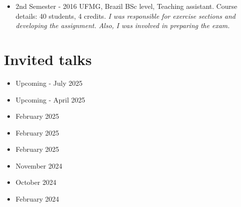 \documentclass[10pt,A4]{article} %
\begin{document}
\begin{itemize}
    \item {}
    {   2nd Semester - 2016  }
    { UFMG, Brazil }
    {  BSc level, Teaching assistant. Course details: 40 students, 4 credits.  \emph{ I was responsible for exercise sections and developing the assignment. Also, I was involved in preparing the exam. } }
    
\end{itemize}

\section{Invited talks}

{\small
\begin{itemize}

    
        \item {}
    { }
    {  Upcoming - July 2025}
    { }{}
    
      
    
        \item {}
    { }
    {  Upcoming - April 2025}
    { }{}
    
      
    
        \item {}
    { }
    {  February 2025}
    { }{}
    
      
    
        \item {}
    { }
    {  February 2025}
    { }{}
    
      
    
        \item {}
    { }
    {  February 2025}
    { }{}
    
      
    
        \item {}
    { }
    {  November 2024}
    { }{}
    
      
    
        \item {}
    { }
    {  October 2024}
    { }{}
    
      
    
        \item {}
    { }
    {  February 2024}
    { }{}
    

\end{itemize}}
\end{document}
